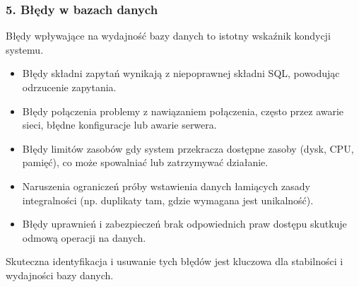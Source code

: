 \documentclass[letterpaper,10pt,polish]{sphinxmanual}
\begin{document}
\subsubsection{5. Błędy w bazach danych}
\label{\detokenize{rozdzial2/Wydajnosc_Skalowanie_i_Replikacja/index:bledy-w-bazach-danych}}
\sphinxAtStartPar
Błędy wpływające na wydajność bazy danych to istotny wskaźnik kondycji systemu.
\begin{description}
\begin{itemize}
\item {} 
\sphinxAtStartPar
Błędy składni zapytań \textendash{} wynikają z niepoprawnej składni SQL, powodując odrzucenie zapytania.

\item {} 
\sphinxAtStartPar
Błędy połączenia \textendash{} problemy z nawiązaniem połączenia, często przez awarie sieci, błędne konfiguracje lub awarie serwera.

\item {} 
\sphinxAtStartPar
Błędy limitów zasobów \textendash{} gdy system przekracza dostępne zasoby (dysk, CPU, pamięć), co może spowalniać lub zatrzymywać działanie.

\item {} 
\sphinxAtStartPar
Naruszenia ograniczeń \textendash{} próby wstawienia danych łamiących zasady integralności (np. duplikaty tam, gdzie wymagana jest unikalność).

\item {} 
\sphinxAtStartPar
Błędy uprawnień i zabezpieczeń \textendash{} brak odpowiednich praw dostępu skutkuje odmową operacji na danych.

\end{itemize}

\sphinxAtStartPar
Skuteczna identyfikacja i usuwanie tych błędów jest kluczowa dla stabilności i wydajności bazy danych.

\end{description}
\end{document}
